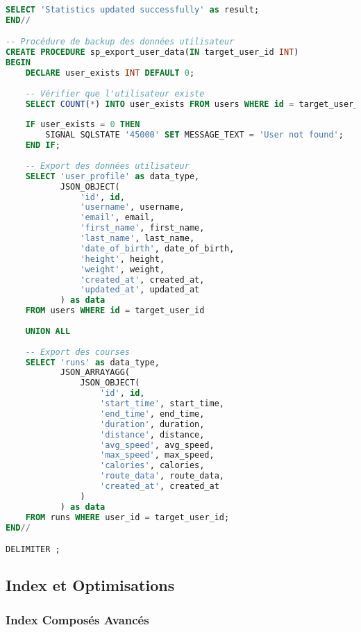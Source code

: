 \begin{lstlisting}[language=sql]
    SELECT 'Statistics updated successfully' as result;
END//

-- Procédure de backup des données utilisateur
CREATE PROCEDURE sp_export_user_data(IN target_user_id INT)
BEGIN
    DECLARE user_exists INT DEFAULT 0;
    
    -- Vérifier que l'utilisateur existe
    SELECT COUNT(*) INTO user_exists FROM users WHERE id = target_user_id;
    
    IF user_exists = 0 THEN
        SIGNAL SQLSTATE '45000' SET MESSAGE_TEXT = 'User not found';
    END IF;
    
    -- Export des données utilisateur
    SELECT 'user_profile' as data_type, 
           JSON_OBJECT(
               'id', id,
               'username', username,
               'email', email,
               'first_name', first_name,
               'last_name', last_name,
               'date_of_birth', date_of_birth,
               'height', height,
               'weight', weight,
               'created_at', created_at,
               'updated_at', updated_at
           ) as data
    FROM users WHERE id = target_user_id
    
    UNION ALL
    
    -- Export des courses
    SELECT 'runs' as data_type,
           JSON_ARRAYAGG(
               JSON_OBJECT(
                   'id', id,
                   'start_time', start_time,
                   'end_time', end_time,
                   'duration', duration,
                   'distance', distance,
                   'avg_speed', avg_speed,
                   'max_speed', max_speed,
                   'calories', calories,
                   'route_data', route_data,
                   'created_at', created_at
               )
           ) as data
    FROM runs WHERE user_id = target_user_id;
END//

DELIMITER ;
\end{lstlisting}

\subsection{Index et Optimisations}

\subsubsection{Index Composés Avancés}

